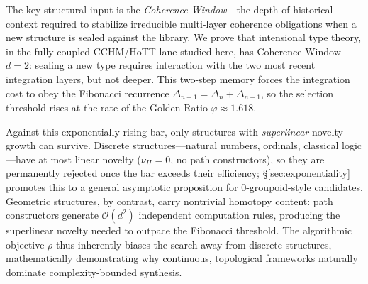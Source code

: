 \documentclass[11pt,a4paper]{article}
\theoremstyle{plain}
\theoremstyle{definition}
\theoremstyle{remark}
\begin{document}
The key structural input is the \emph{Coherence Window}---the depth of historical context required to stabilize irreducible multi-layer coherence obligations when a new structure is sealed against the library.
We prove that intensional type theory, in the fully coupled CCHM/HoTT lane studied here, has Coherence Window $d = 2$: sealing a new type requires interaction with the two most recent integration layers, but not deeper.
This two-step memory forces the integration cost to obey the Fibonacci recurrence $\Delta_{n+1} = \Delta_n + \Delta_{n-1}$, so the selection threshold rises at the rate of the Golden Ratio $\varphi \approx 1.618$.

Against this exponentially rising bar, only structures with \emph{superlinear} novelty growth can survive.
Discrete structures---natural numbers, ordinals, classical logic---have at most linear novelty ($\nu_H = 0$, no path constructors), so they are permanently rejected once the bar exceeds their efficiency; \S\ref{sec:exponentiality} promotes this to a general asymptotic proposition for $0$-groupoid-style candidates.
Geometric structures, by contrast, carry nontrivial homotopy content: path constructors generate $\mathcal{O}(d^2)$ independent computation rules, producing the superlinear novelty needed to outpace the Fibonacci threshold.
The algorithmic objective $\rho$ thus inherently biases the search away from discrete structures, mathematically demonstrating why continuous, topological frameworks naturally dominate complexity-bounded synthesis.
\end{document}
